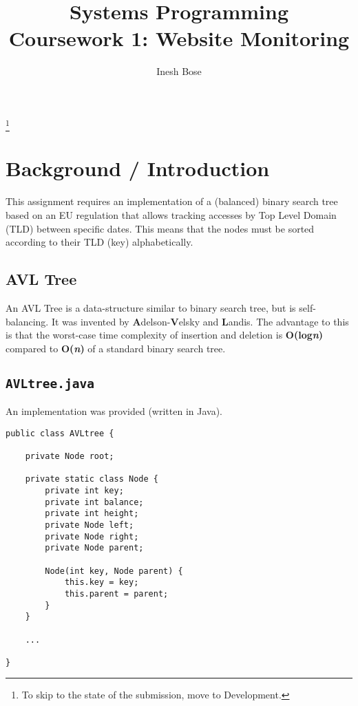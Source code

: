 \documentclass{article}
\title{Systems Programming\\ \normalsize{\textbf{Coursework 1:} Website Monitoring}}
\author{Inesh Bose}
\date{}
\newcommand{\code}[1]{\texttt{#1}}
\begin{document}
\renewcommand{\thefootnote}{}

\maketitle
\vspace{2cm}
\tableofcontents
{}

\footnote{To skip to the state of the submission, move to Development.}


\newpage

\section{Background / Introduction}

This assignment requires an implementation of a (balanced) binary search tree based on an EU regulation that allows tracking accesses by Top Level Domain (TLD) between specific dates. This means that the nodes must be sorted according to their TLD (key) alphabetically.

\subsection{AVL Tree}
An AVL Tree is a data-structure similar to binary search tree, but is self-balancing. It was invented by \textbf{A}delson-\textbf{V}elsky and \textbf{L}andis. The advantage to this is that the worst-case time complexity of insertion and deletion is\textbf{ O(log\textit{n})} compared to \textbf{O(\textit{n})} of a standard binary search tree.

\subsection{\code{AVLtree.java}}
An implementation was provided (written in Java).

\begin{verbatim}
public class AVLtree {
 
    private Node root;
 
    private static class Node {
        private int key;
        private int balance;
        private int height;
        private Node left;
        private Node right;
        private Node parent;
 
        Node(int key, Node parent) {
            this.key = key;
            this.parent = parent;
        }
    }
    
    ...

}
\end{verbatim}
\end{document}
